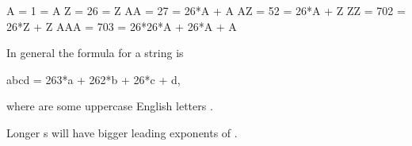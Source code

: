 \documentclass[letterpaper,12pt,english]{book}
\begin{document}
\begin{sphinxVerbatim}[commandchars=\\\{\}]
\PYGZdq{}A\PYGZdq{}   =  1    =  \PYGZsq{}A\PYGZsq{}
\PYGZdq{}Z\PYGZdq{}   =  26   =  \PYGZsq{}Z\PYGZsq{}
\PYGZdq{}AA\PYGZdq{}  =  27   =  26*\PYGZsq{}A\PYGZsq{} + \PYGZsq{}A\PYGZsq{}
\PYGZdq{}AZ\PYGZdq{}  =  52   =  26*\PYGZsq{}A\PYGZsq{} + \PYGZsq{}Z\PYGZsq{}
\PYGZdq{}ZZ\PYGZdq{}  =  702  =  26*\PYGZsq{}Z\PYGZsq{} + \PYGZsq{}Z\PYGZsq{}
\PYGZdq{}AAA\PYGZdq{} =  703  =  26*26*\PYGZsq{}A\PYGZsq{} + 26*\PYGZsq{}A\PYGZsq{} + \PYGZsq{}A\PYGZsq{}
\end{sphinxVerbatim}

\sphinxAtStartPar
In general the formula for a string  is

\begin{sphinxVerbatim}[commandchars=\\\{\}]
abcd = 26\PYGZca{}3*a + 26\PYGZca{}2*b + 26*c + d,
\end{sphinxVerbatim}

\sphinxAtStartPar
where  are some uppercase English letters .

\sphinxAtStartPar
Longer s will have bigger leading exponents of .
\end{document}
